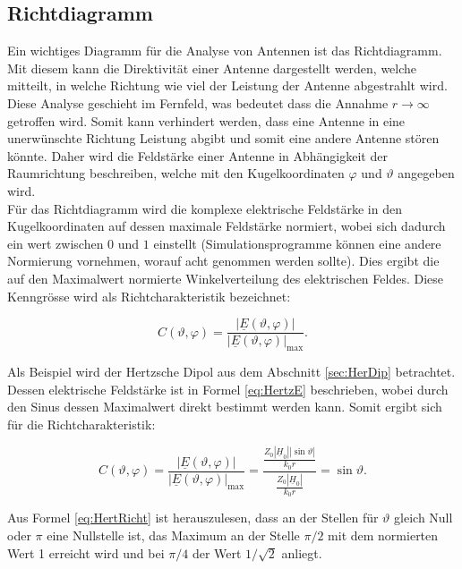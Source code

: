 \subsection{Richtdiagramm}

Ein wichtiges Diagramm für die Analyse von Antennen ist das Richtdiagramm. Mit diesem kann die Direktivität einer Antenne dargestellt werden, welche mitteilt, in welche Richtung wie viel der Leistung der Antenne abgestrahlt wird. Diese Analyse geschieht im Fernfeld, was bedeutet dass die Annahme $r \rightarrow \infty$ getroffen wird. Somit kann verhindert werden, dass eine Antenne in eine unerwünschte Richtung Leistung abgibt und somit eine andere Antenne stören könnte. Daher wird die Feldstärke einer Antenne in Abhängigkeit der Raumrichtung beschreiben, welche mit den Kugelkoordinaten $\varphi$ und $\vartheta$ angegeben wird.\\

Für das Richtdiagramm wird die komplexe elektrische Feldstärke in den Kugelkoordinaten auf dessen maximale Feldstärke normiert, wobei sich dadurch ein wert zwischen $0$ und $1$ einstellt (Simulationsprogramme können eine andere Normierung vornehmen, worauf acht genommen werden sollte). Dies ergibt die auf den Maximalwert normierte Winkelverteilung des elektrischen Feldes. Diese Kenngrösse wird als Richtcharakteristik bezeichnet:

\begin{equation}
C(\vartheta,\varphi) = \frac{|\underline{E}(\vartheta,\varphi)|}{|\underline{E}(\vartheta,\varphi)|_{\mathrm{max}}}.
\end{equation}

Als Beispiel wird der Hertzsche Dipol aus dem Abschnitt \ref{sec:HerDip} betrachtet. Dessen elektrische Feldstärke ist in Formel \ref{eq:HertzE} beschrieben, wobei durch den Sinus dessen Maximalwert direkt bestimmt werden kann. Somit ergibt sich für die Richtcharakteristik:

\begin{equation}\label{eq:HertRicht}
C(\vartheta,\varphi) = \frac{|\underline{E}(\vartheta,\varphi)|}{|\underline{E}(\vartheta,\varphi)|_{\mathrm{max}}} = \frac{\frac{Z_0 |\underline{H}_0| |\sin \vartheta|}{k_0r}}{\frac{Z_0 |\underline{H}_0|}{k_0r}} = \sin \vartheta.
\end{equation}

Aus Formel \ref{eq:HertRicht} ist herauszulesen, dass an der Stellen für $\vartheta$ gleich Null oder $\pi$ eine Nullstelle ist, das Maximum an der Stelle $\pi/2$ mit dem normierten Wert 1 erreicht wird und bei $\pi/4$ der Wert $1/\sqrt{2}$ anliegt.\\

